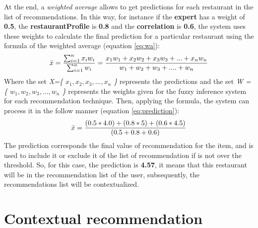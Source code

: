 At the end, a \textit{weighted average} allows to get predictions for
each restaurant in the list of recommendations. In this way, for
instance if the \textbf{expert} has a weight of \textbf{0.5}, the
\textbf{restaurantProfile} is \textbf{0.8} and the
\textbf{correlation} is \textbf{0.6}, the system uses these weights to
calculate the final prediction for a particular restaurant using the
formula of the weighted average (equation \ref{eq:wa}):
\begin{equation}\label{eq:wa}
\displaystyle \bar{x} = {\sum_{i=1}^{n} x_{i} w_{i}
\over \sum_{i=1}^{n} w_{i} } = 
{x_{1}w_{1} + x_{2}w_{2} + x_{3}w_{3} + ... + x_{n}w_{n} 
\over w_{1} + w_{2} + w_{3} + .... + w_{n}}
\end{equation}
Where the set \textit{X=\{ $x_{1}, x_{2}, x_{3},...,x_{n}$ \}} represents the 
predictions and the set \textit{W = \{ $w_{1}, w_{2}, w_{3},...,w_{n}$ \} } 
represents the weights 
given for the fuzzy inference system for each recommendation technique. 
Then, applying the formula, the system can process it in the follow manner  
(equation \ref{eq:prediction}):
\begin{equation}\label{eq:prediction}
\displaystyle \bar{x}  = {(0.5 * 4.0) + ( 0.8 * 5) + (0.6 * 4.5)
\over (0.5 + 0.8 + 0.6)}
\end{equation}
The prediction corresponds the final value of recommendation for the
item, and is used to include it or exclude it of the list of
recommendation if is not over the threshold. So, for this case, the
prediction is \textbf{4.57}, it means that this restaurant will be in the
recommendation list of the user, subsequently, the recommendations
list will be contextualized.

\section{Contextual recommendation} 

